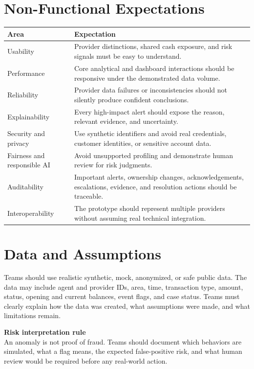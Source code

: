 \documentclass[11pt,a4paper]{article}
\begin{document}
\section{Non-Functional Expectations}
\noindent
\begin{tabularx}{\textwidth}{@{} l X @{}}
\toprule
\textbf{Area} & \textbf{Expectation} \\
\midrule
Usability & Provider distinctions, shared cash exposure, and risk signals must be easy to understand. \\
\addlinespace
Performance & Core analytical and dashboard interactions should be responsive under the demonstrated data volume. \\
\addlinespace
Reliability & Provider data failures or inconsistencies should not silently produce confident conclusions. \\
\addlinespace
Explainability & Every high-impact alert should expose the reason, relevant evidence, and uncertainty. \\
\addlinespace
Security and privacy & Use synthetic identifiers and avoid real credentials, customer identities, or sensitive account data. \\
\addlinespace
Fairness and responsible AI & Avoid unsupported profiling and demonstrate human review for risk judgments. \\
\addlinespace
Auditability & Important alerts, ownership changes, acknowledgements, escalations, evidence, and resolution actions should be traceable. \\
\addlinespace
Interoperability & The prototype should represent multiple providers without assuming real technical integration. \\
\bottomrule
\end{tabularx}

\section{Data and Assumptions}
Teams should use realistic synthetic, mock, anonymized, or safe public data. The data may include agent and provider IDs, area, time, transaction type, amount, status, opening and current balances, event flags, and case status. Teams must clearly explain how the data was created, what assumptions were made, and what limitations remain.

\textbf{Risk interpretation rule}\\
An anomaly is not proof of fraud. Teams should document which behaviors are simulated, what a flag means, the expected false-positive risk, and what human review would be required before any real-world action.
\end{document}
